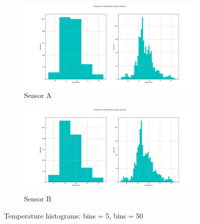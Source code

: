 \documentclass[a4paper]{article}
\begin{document}
        \begin{figure}[H]
        \centering
            \begin{subfigure}[b]{0.4\linewidth}
              \includegraphics[width=\linewidth]{images/Histogram_of_Temperature_values_Sensor_A.png}
              \caption{Sensor A}
            \end{subfigure}
            \begin{subfigure}[b]{0.4\linewidth}
              \includegraphics[width=\linewidth]{images/Histogram_of_Temperature_values_Sensor_B.png}
              \caption{Sensor B}
            \end{subfigure}
            \caption{Temperature histograms: bins = 5, bins = 50}
            \label{fig:Histogram}
        \end{figure} 
        
\end{document}
